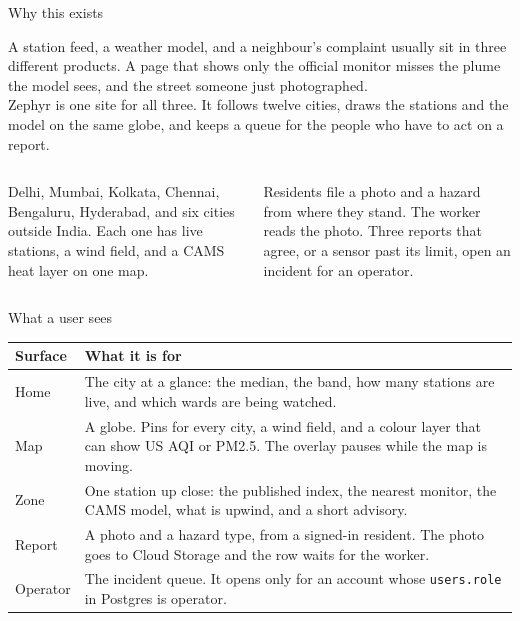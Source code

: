 \documentclass[t,aspectratio=169]{beamer}
\begin{document}
\begin{frame}[c]{Why this exists}
  \begin{nlhighlight}
    A station feed, a weather model, and a neighbour's complaint usually sit in three different products. A page that shows only the official monitor misses the plume the model sees, and the street someone just photographed.\\[0.3em]
    Zephyr is one site for all three. It follows twelve cities, draws the stations and the model on the same globe, and keeps a queue for the people who have to act on a report.
  \end{nlhighlight}
  \vspace{0.18cm}
  \begin{columns}[T,totalwidth=\textwidth]
    \begin{column}{0.48\textwidth}
      \begin{eqcard}{2.15cm}
        Delhi, Mumbai, Kolkata, Chennai, Bengaluru, Hyderabad, and six cities outside India. Each one has live stations, a wind field, and a CAMS heat layer on one map.
      \end{eqcard}
    \end{column}
    \hfill
    \begin{column}{0.48\textwidth}
      \begin{eqcard}{2.15cm}
        Residents file a photo and a hazard from where they stand. The worker reads the photo. Three reports that agree, or a sensor past its limit, open an incident for an operator.
      \end{eqcard}
    \end{column}
  \end{columns}
\end{frame}

\begin{frame}[c]{What a user sees}
  \footnotesize
  \renewcommand{\arraystretch}{1.18}
  \begin{tabularx}{\textwidth}{@{}H Y@{}}
    \toprule
    \textcolor{nlNavy}{\textbf{Surface}} & \textbf{What it is for} \\
    \midrule
    Home & The city at a glance: the median, the band, how many stations are live, and which wards are being watched. \\
    Map & A globe. Pins for every city, a wind field, and a colour layer that can show US AQI or PM2.5. The overlay pauses while the map is moving. \\
    Zone & One station up close: the published index, the nearest monitor, the CAMS model, what is upwind, and a short advisory. \\
    Report & A photo and a hazard type, from a signed-in resident. The photo goes to Cloud Storage and the row waits for the worker. \\
    Operator & The incident queue. It opens only for an account whose \texttt{users.role} in Postgres is operator. \\
    \bottomrule
  \end{tabularx}
\end{frame}
\end{document}
